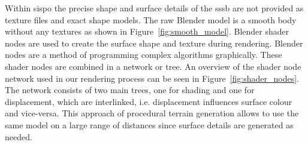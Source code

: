 \begin{table}[htb]
    \centering
    \caption{Input parameters to describe an instrument.}
    \label{tab:inst_input}
\end{table}

Within \gls{sispo} the precise shape and surface details of the \gls{sssb} are not provided as texture files and exact shape models. The raw Blender model is a smooth body without any textures as shown in Figure~\ref{fig:smooth_model}. Blender shader nodes are used to create the surface shape and texture during rendering. Blender nodes are a method of programming complex algorithms graphically. These shader nodes are combined in a network or tree. An overview of the shader node network used in our rendering process can be seen in Figure~\ref{fig:shader_nodes}. The network consists of two main trees, one for shading and one for displacement, which are interlinked, i.e. displacement influences surface colour and vice-versa. This approach of procedural terrain generation allows to use the same model on a large range of distances since surface details are generated as needed.

